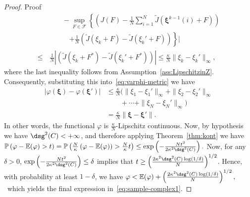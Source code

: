 \documentclass[11pt,leqno]{amsart}
\begin{document}
\begin{proof}{Proof}
\begin{align*}
    &\qquad- \sup_{F \in \mathcal{F}} \left \{ \left(J(F) - \frac{1}{N} \sum_{i=1}^N \tilde J( \boldsymbol\xi ^{k-1}(i) +F) \right) \right. \\
    &\qquad\quad \left.+ \frac{1}{N} \left( \tilde J(\xi_k+F) - \tilde{J}(\xi_k'+F) \right)  \right\}\bigg|\\
     \leq&\,\frac{1}{N}\left|\left( \tilde J(\xi_k+F^*)-\tilde J(\xi_k'+F^*) \right)\right| \leq \frac{\kappa}{N}\|\xi_k-\xi_k'\|_{\infty},
\end{align*}
where the last inequality follows from Assumption~\ref{ass:LipschitzinZ}. Consequently, substituting this into~\eqref{eq:varphi-metric} we have
\begin{equation}
\begin{aligned}  
|\varphi( \boldsymbol\xi )-\varphi( \boldsymbol\xi ')|
\label{eq:varphi-lip}
&\leq\frac{\kappa}{N}\Big(\|\xi_1-\xi_1'\|_{\infty}+\|\xi_2-\xi_2'\|_{\infty}\\
&\qquad+\cdots+\|\xi_N-\xi_N'\|_{\infty}\Big)\\
&=\frac{\kappa}{N} \| \boldsymbol\xi - \boldsymbol\xi '\|.
\end{aligned}     
\end{equation}
In other words, the functional $\varphi$ is $\frac{\kappa}{N}$-Lipschitz continuous. 
\sloppy Now, by hypothesis we have $\dsg^2(C)<+\infty$, and therefore applying Theorem~\ref{thm:kont} we have
\(
    \mathbb P\left(\varphi-\mathbb E(\varphi)>t\right) = \mathbb P\left(\frac{N}{\kappa}\left(\varphi-\mathbb E(\varphi) \right)>\frac{N}{\kappa}t\right)
    \leq \exp\left(-\frac{Nt^2}{2\kappa^2\dsg^2(C)} \right).
\)
Now, for any $\delta>0$, $\exp\left(-\frac{Nt^2}{2\kappa^2\dsg^2(C)}\right)\leq \delta$ implies that $t\geq \left(\frac{2\kappa^2\dsg^2(C)\log(1/\delta)}{N}\right)^{1/2}$. Hence, with probability at least $1-\delta$, we have
\(
     \varphi<\mathbb E(\varphi)+ \left(\frac{2\kappa^2\dsg^2(C)\log(1/\delta)}{N}\right)^{1/2},
\)
~which yields the final expression in~\eqref{eq:sample-complex1}.
 \end{proof}
\end{document}
